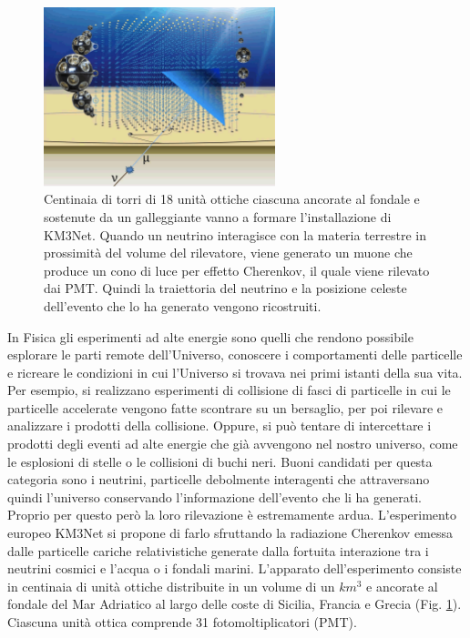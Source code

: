 \documentclass[../main.tex]{subfiles}
\begin{document}
\begin{figure}[!b]
    \centering
    \includegraphics[width=0.6\textwidth]{KM3NetTowers.png}
    \caption{\small Centinaia di torri di 18 unità ottiche ciascuna ancorate al fondale e sostenute da un galleggiante vanno a formare l'installazione di KM3Net. Quando un neutrino interagisce con la materia terrestre in prossimità del volume del rilevatore, viene generato un muone che produce un cono di luce per effetto Cherenkov, il quale viene rilevato dai PMT. Quindi la traiettoria del neutrino e la posizione celeste dell'evento che lo ha generato vengono ricostruiti.} \label{fig:towers}
\end{figure}       
In Fisica gli esperimenti ad alte energie sono quelli che rendono possibile esplorare le parti remote dell'Universo, conoscere i comportamenti delle particelle e ricreare le condizioni in cui l'Universo si trovava nei primi istanti della sua vita. Per esempio, si realizzano esperimenti di collisione di fasci di particelle in cui le particelle accelerate vengono fatte scontrare su un bersaglio, per poi rilevare e analizzare i prodotti della collisione. Oppure, si può tentare di intercettare i prodotti degli eventi ad alte energie che già avvengono nel nostro universo, come le esplosioni di stelle o le collisioni di buchi neri. Buoni candidati per questa categoria sono i neutrini, particelle debolmente interagenti che attraversano quindi l'universo conservando l'informazione dell'evento che li ha generati. Proprio per questo però la loro rilevazione è estremamente ardua. L'esperimento europeo KM3Net si propone di farlo sfruttando la radiazione Cherenkov emessa dalle particelle cariche relativistiche generate dalla fortuita interazione tra i neutrini cosmici e l'acqua o i fondali marini. L'apparato dell'esperimento consiste in centinaia di unità ottiche distribuite in un volume di un $km^3$ e ancorate al fondale del Mar Adriatico al largo delle coste di Sicilia, Francia e Grecia (Fig. \ref{fig:towers}). Ciascuna unità ottica comprende 31 fotomoltiplicatori (PMT). 
\end{document}
